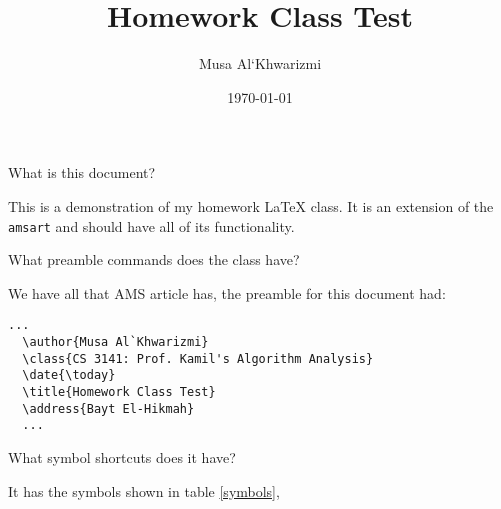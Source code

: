 \documentclass{homework}
\author{Musa Al`Khwarizmi}
\date{\today}
\title{Homework Class Test}
\begin{document}
 \maketitle

\question What is this document?

This is a demonstration of my homework \LaTeX{} class. It is an extension of the \texttt{amsart} and should have all of its functionality.

\question What preamble commands does the class have?

We have all that AMS article has, the preamble for this document had:

\begin{lstlisting}[language={[LaTeX]TeX}]
  ...
  \author{Musa Al`Khwarizmi}
  \class{CS 3141: Prof. Kamil's Algorithm Analysis}
  \date{\today}
  \title{Homework Class Test}
  \address{Bayt El-Hikmah}
  ...
\end{lstlisting}

\question What symbol shortcuts does it have?

It has the symbols shown in table \ref{symbols},
\end{document}
